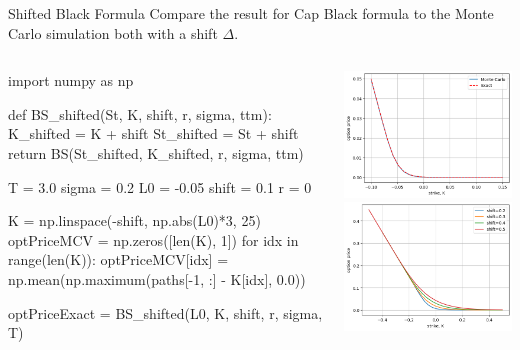 \documentclass{beamer}
\begin{document}
\begin{frame}[fragile]{Shifted Black Formula}
Compare the result for Cap Black formula to the Monte Carlo simulation both with a shift $\Delta$.
\begin{columns}
\begin{ipython}
import numpy as np

def BS_shifted(St, K, shift, r, sigma, ttm):
    K_shifted = K + shift
    St_shifted = St + shift
    return BS(St_shifted, K_shifted, r, sigma, ttm)

T = 3.0
sigma = 0.2
L0 = -0.05
shift = 0.1
r = 0

K = np.linspace(-shift, np.abs(L0)*3, 25)
optPriceMCV = np.zeros([len(K), 1])
for idx in range(len(K)):
  optPriceMCV[idx] = np.mean(np.maximum(paths[-1, :] - K[idx], 0.0))

optPriceExact = BS_shifted(L0, K, shift, r, sigma, T)
\end{ipython}
\begin{center}
\includegraphics[width=0.65\linewidth]{images/shifted_call_BS_vs_MC}\\
\includegraphics[width=0.65\linewidth]{images/shifted_call}
\end{center}
\end{columns}
\end{frame}
\end{document}

